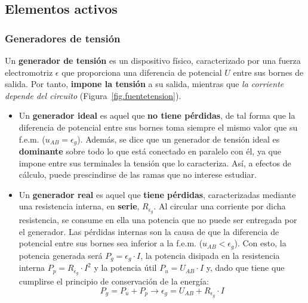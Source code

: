 	\subsection{Elementos activos}\label{sec.elementos_activos}
	
	\subsubsection{Generadores de tensión}
	Un \textbf{generador de tensión} es un dispositivo físico, caracterizado por una fuerza electromotriz $\epsilon$ que proporciona una diferencia de potencial $U$ entre sus bornes de salida. Por tanto, \textbf{impone la tensión} a su salida, mientras que \emph{la corriente depende del circuito} (Figura~\ref{fig.fuentetension}).
	\begin{itemize}
		\item Un \textbf{generador ideal} es aquel que \textbf{no tiene pérdidas}, de tal forma que la diferencia de potencial entre sus bornes toma siempre el mismo valor que su f.e.m. ($u_{AB}=\epsilon_g$). Además, se dice que un generador de tensión ideal es \textbf{dominante} sobre todo lo que está conectado en paralelo con él, ya que impone entre sus terminales la tensión que lo caracteriza. Así, a efectos de cálculo, puede prescindirse de las ramas que no interese estudiar.
		\item Un \textbf{generador real} es aquel que \textbf{tiene pérdidas}, caracterizadas mediante una resistencia interna, en \textbf{serie}, $R_{\epsilon_g}$. Al circular una corriente por dicha resistencia, se consume en ella una potencia que no puede ser entregada por el generador. Las pérdidas internas son la causa de que la diferencia de potencial entre sus bornes sea inferior a la f.e.m. ($u_{AB}<\epsilon_g$). Con esto, la potencia generada será $P_g=\epsilon_g\cdot I$, la potencia disipada en la resistencia interna $P_p=R_{\epsilon_g}\cdot I^2$ y la potencia útil $P_u=U_{AB}\cdot I$ y, dado que tiene que cumplirse el principio de conservación de la energía:
		\begin{equation}
			P_g=P_u+P_p\rightarrow \boxed{ \epsilon_g=U_{AB}+ R_{\epsilon_g}\cdot I}
		\end{equation}
	\end{itemize}
